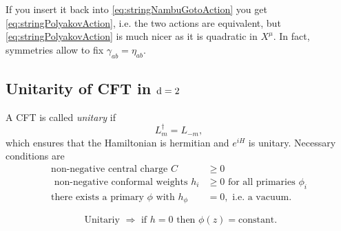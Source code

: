  	 
 	 If you insert it back into \ref{eq:stringNambuGotoAction} you get \ref{eq:stringPolyakovAction}, i.e. the two actions are equivalent, but \ref{eq:stringPolyakovAction} is much nicer as it is quadratic in $X^\mu$. In fact, symmetries allow to fix $\gamma_{ab} = \eta_{ab}$.
 	
 	
 	
 	 	\subsection{Unitarity of CFT in $\mathrm{d}=2$}
 	\begin{mybox}{}
 		A CFT is called \emph{unitary} if 
 		\begin{equation}
 		L^\dagger_m = L_{-m},
 		\end{equation}
 		which ensures that the Hamiltonian is hermitian and $e^{iH}$ is unitary. Necessary conditions are
 		\begin{align}
 			\text{non-negative central charge } C &\geq 0 \\
 			\text{ non-negative conformal weights } h_i &\geq 0 \text{ for all primaries }\phi_i \\
 			\text{there exists a primary $\phi$ with }h_\phi &=0, \text{ i.e. a vacuum}.
 		\end{align}
 	\end{mybox}
 	
 	\begin{equation}
 	\text{ Unitariy $\Rightarrow$ if $h=0$ then $\phi(z)=$constant.}
 	\end{equation}
 	
 	
 	
 	
